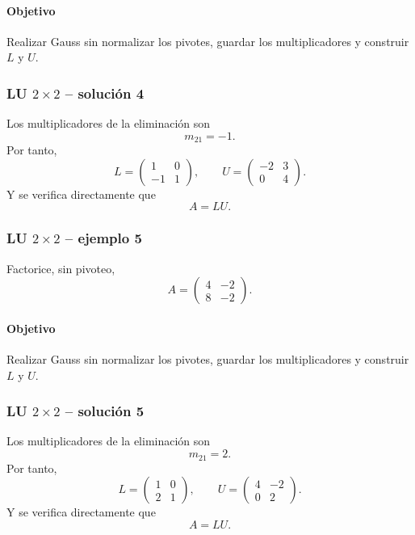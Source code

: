 \paragraph{Objetivo}
Realizar Gauss sin normalizar los pivotes, guardar los multiplicadores y construir $L$ y $U$.



\subsubsection*{LU $2\times 2$ -- solución 4}

Los multiplicadores de la eliminación son
\[
m_{21}=-1.
\]
Por tanto,
\[
L=\begin{pmatrix}1 & 0\\-1 & 1\end{pmatrix},\qquad U=\begin{pmatrix}-2 & 3\\0 & 4\end{pmatrix}.
\]
Y se verifica directamente que
\[
\boxed{A=LU}.
\]


\subsubsection*{LU $2\times 2$ -- ejemplo 5}

Factorice, sin pivoteo,
\[
A=\begin{pmatrix}4 & -2\\8 & -2\end{pmatrix}.
\]

\paragraph{Objetivo}
Realizar Gauss sin normalizar los pivotes, guardar los multiplicadores y construir $L$ y $U$.



\subsubsection*{LU $2\times 2$ -- solución 5}

Los multiplicadores de la eliminación son
\[
m_{21}=2.
\]
Por tanto,
\[
L=\begin{pmatrix}1 & 0\\2 & 1\end{pmatrix},\qquad U=\begin{pmatrix}4 & -2\\0 & 2\end{pmatrix}.
\]
Y se verifica directamente que
\[
\boxed{A=LU}.
\]

